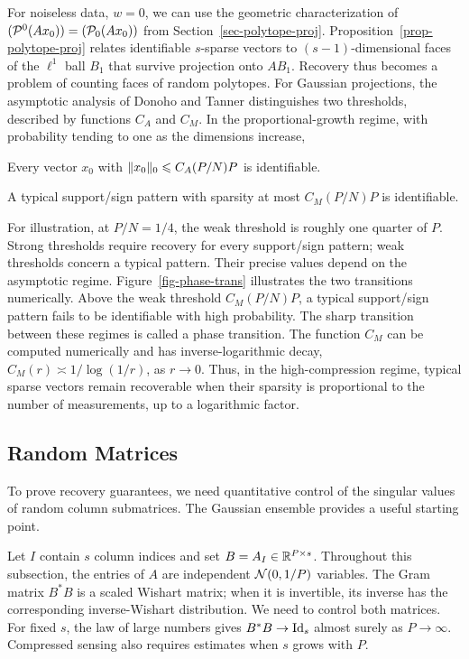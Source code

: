 For noiseless data, $w=0$, we can use the geometric characterization of $(\mathcal{P}^0(Ax_0))=(\mathcal{P}_0(Ax_0))$ from Section~\ref{sec-polytope-proj}. Proposition~\ref{prop-polytope-proj} relates identifiable $s$-sparse vectors to $(s-1)$-dimensional faces of the $\ell^1$ ball $B_1$ that survive projection onto $AB_1$. Recovery thus becomes a problem of counting faces of random polytopes. For Gaussian projections, the asymptotic analysis of Donoho and Tanner distinguishes two thresholds, described by functions $C_A$ and $C_M$. In the proportional-growth regime, with probability tending to one as the dimensions increase,
\begin{rs}
	\item Every vector $x_0$ with $\lVert x_0\rVert_0 \leqslant C_A(P/N)P$ is identifiable.
	\item A typical support/sign pattern with sparsity at most $C_M(P/N)P$ is identifiable.
\end{rs}
For illustration, at $P/N=1/4$, the weak threshold is roughly one quarter of $P$. Strong thresholds require recovery for every support/sign pattern; weak thresholds concern a typical pattern. Their precise values depend on the asymptotic regime. Figure~\ref{fig-phase-trans} illustrates the two transitions numerically.
%
Above the weak threshold $C_M(P/N)P$, a typical support/sign pattern fails to be identifiable with high probability. The sharp transition between these regimes is called a phase transition.
%
%
The function $C_M$ can be computed numerically and has inverse-logarithmic decay, $C_M(r)\asymp1/\log(1/r)$, as $r\to0$. Thus, in the high-compression regime, typical sparse vectors remain recoverable when their sparsity is proportional to the number of measurements, up to a logarithmic factor.


\subsection{Random Matrices}
\label{sec-random-matrix}

To prove recovery guarantees, we need quantitative control of the singular values of random column submatrices. The Gaussian ensemble provides a useful starting point.

Let $I$ contain $s$ column indices and set $B=A_I\in\mathbb{R}^{P\times s}$. Throughout this subsection, the entries of $A$ are independent $\mathcal{N}(0,1/P)$ variables. The Gram matrix $B^*B$ is a scaled Wishart matrix; when it is invertible, its inverse has the corresponding inverse-Wishart distribution. We need to control both matrices.
%
For fixed $s$, the law of large numbers gives $B^*B\to\mathrm{Id}_s$ almost surely as $P\to\infty$. Compressed sensing also requires estimates when $s$ grows with $P$.

